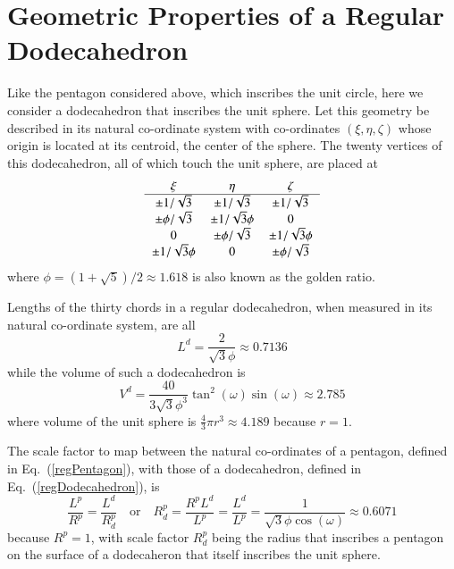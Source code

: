 \section{Geometric Properties of a Regular Dodecahedron}

Like the pentagon considered above, which inscribes the unit circle, here we consider a dodecahedron that inscribes the unit sphere.  Let this geometry be described in its natural co-ordinate system with co-ordinates $(\xi , \eta , \zeta )$ whose origin is located at its centroid, the center of the sphere.  The twenty vertices of this dodecahedron, all of which touch the unit sphere, are placed at
\begin{equation}
\begin{tabular}{ccc}
	$\xi$ & $\eta$ & $\zeta$ \\ \hline
	$\pm 1 / \sqrt{3}$ & $\pm 1 / \sqrt{3}$ & $\pm 1 / \sqrt{3}^{\vphantom{|}}$ \\
	$\pm \phi / \sqrt{3}$ & $\pm 1 / \sqrt{3} \phi$ & 0 \\
	0 & $\pm \phi / \sqrt{3}$ & $\pm 1 / \sqrt{3} \phi$ \\
	$\pm 1 / \sqrt{3} \phi$ & 0 & $\pm \phi / \sqrt{3}$
\end{tabular}
\label{regDodecahedron}
\end{equation}
where $\phi = (1 + \sqrt{5})/2 \approx 1.618$ is also known as the golden ratio.

Lengths of the thirty chords in a regular dodecahedron, when measured in its natural co-ordinate system, are all
\begin{equation}
	L^{\!d} = \frac{2}{\sqrt{3} \phi} \approx 0.7136
	\label{regDodecahedronLength}
\end{equation}
while the volume of such a dodecahedron is
\begin{equation}
	V^d = \frac{40}{3 \sqrt{3} \phi^3} \tan^2 ( \omega ) \sin ( \omega ) \approx 2.785
\label{regDodecahedronVolume}
\end{equation}
where volume of the unit sphere is $\tfrac{4}{3} \pi r^3 \approx 4.189$ because $r=1$.

The scale factor to map between the natural co-ordinates of a pentagon, defined in Eq.~(\ref{regPentagon}), with those of a dodecahedron, defined in Eq.~(\ref{regDodecahedron}), is
\begin{equation}
	\frac{L^{\!p}}{R^p} = \frac{L^{\!d}}{R^p_d} 
	\quad \text{or} \quad
	R^p_d = \frac{R^p L^{\!d}}{L^{\!p}} = \frac{L^{\!d}}{L^{\!p}} = 
	\frac{1}{\sqrt{3} \phi \cos (\omega)} \approx 0.6071
	\label{scaleFactor}
\end{equation}
because $R^p = 1$, with scale factor $R^p_d$ being the radius that inscribes a pentagon on the surface of a dodecaheron that itself inscribes the unit sphere.

